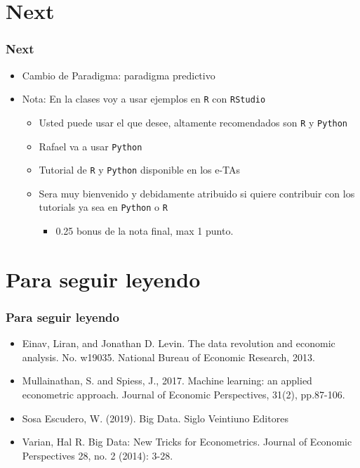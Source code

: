 \documentclass[
  shownotes,
  xcolor={svgnames},
  hyperref={colorlinks,citecolor=DarkBlue,linkcolor=DarkRed,urlcolor=DarkBlue}
  , aspectratio=169]{beamer}
\begin{document}

\section{Next}

\begin{frame}
\frametitle{Next}
  
  \begin{itemize} 
  \item Cambio de Paradigma: paradigma predictivo
  \bigskip
  \item Nota: En la clases voy a usar ejemplos en \texttt{R} con \texttt{RStudio}
  \medskip
    \begin{itemize} 
      \item Usted puede usar el que desee, altamente recomendados son \texttt{R} y \texttt{Python} 
      \medskip
      \item Rafael va a usar \texttt{Python} 
      \medskip
      \item Tutorial de \texttt{R}  y \texttt{Python}  disponible en los e-TAs
      \medskip
      \item Sera muy bienvenido y debidamente atribuido si quiere contribuir con los tutorials ya sea en  \texttt{Python}  o \texttt{R} 
      \begin{itemize}
        \item  0.25 bonus de la nota final, max 1 punto.
      
      \end{itemize}
    \end{itemize}
  \end{itemize}


\end{frame}


\section{Para seguir leyendo }

\begin{frame}
\frametitle{Para seguir leyendo}

\begin{itemize}
  \item Einav, Liran, and Jonathan D. Levin. The data revolution and economic analysis. No. w19035. National Bureau of Economic Research, 2013.
  \bigskip
  \item Mullainathan, S. and Spiess, J., 2017. Machine learning: an applied econometric approach. Journal of Economic Perspectives, 31(2), pp.87-106.
  \bigskip
  \item Sosa Escudero, W. (2019). Big Data. Siglo Veintiuno Editores
  \bigskip
  \item Varian, Hal R. Big Data: New Tricks for Econometrics. Journal of Economic Perspectives 28, no. 2 (2014): 3-28.

\end{itemize}
\end{frame}
\end{document}
